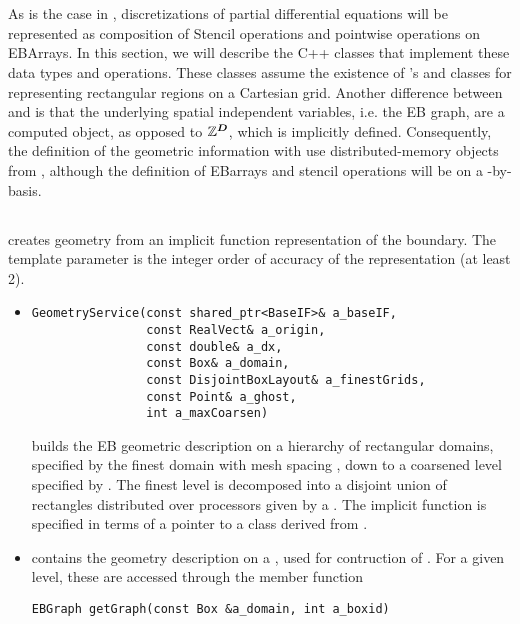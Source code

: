 \documentclass[12pt]{article}
\begin{document}
\section{} 

As is the case in , discretizations of partial differential equations will be represented as composition of Stencil operations and pointwise operations on EBArrays. In this section, we will describe the C++ classes that implement these data types and operations. These classes assume the existence of 's  and  classes for representing rectangular regions on a Cartesian grid. Another difference between  and  is that the underlying spatial independent variables, i.e. the EB graph, are a computed object, as opposed to $\mathbb{Z}^{\boldsymbol{D}}$, which is implicitly defined. Consequently, the definition of the geometric information with use distributed-memory objects from , although the definition of EBarrays and stencil operations will be on a -by- basis. 

\subsection{}
 creates geometry from an implicit function representation of the boundary. The template parameter  is the integer order of accuracy of the representation (at least 2). 
\begin{itemize}
\item
\begin{verbatim}
GeometryService(const shared_ptr<BaseIF>& a_baseIF,
                const RealVect& a_origin,
                const double& a_dx,
                const Box& a_domain,
                const DisjointBoxLayout& a_finestGrids,
                const Point& a_ghost,
                int a_maxCoarsen)
\end{verbatim}
builds the EB geometric description on a hierarchy of rectangular domains, specified by the finest domain  with mesh spacing , down to a coarsened level specified by . The finest level is decomposed into a disjoint union of rectangles distributed over processors given by a  . The implicit function is specified in terms of a pointer to a class derived from . 
\item
{} contains the geometry description on a , used for contruction of . For a given level, these are accessed through the  member function 
\begin{verbatim} 
EBGraph getGraph(const Box &a_domain, int a_boxid)
\end{verbatim}
\end{itemize}
\end{document}
